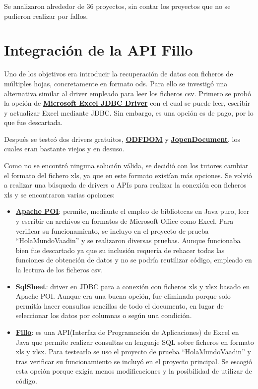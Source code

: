 Se analizaron alrededor de 36 proyectos, sin contar los proyectos que no se pudieron realizar por fallos.

\section{Integración de la API Fillo}
Uno de los objetivos era introducir la recuperación de datos con ficheros de múltiples hojas, concretamente en formato ods.
Para ello se investigó una alternativa similar al driver empleado para leer los ficheros csv. Primero se probó la opción de \textbf{\href{https://www.cdata.com/drivers/excel/jdbc/}{Microsoft Excel JDBC Driver}} con el cual se puede leer, escribir y actualizar Excel mediante JDBC. Sin embargo, es una opción es de pago, por lo que fue descartada. 

Después se testeó dos drivers gratuitos, \textbf{\href{https://odftoolkit.org/}{ODFDOM}} y \textbf{\href{http://www.jopendocument.org/}{JopenDocument}}, los cuales eran bastante viejos y en desuso.

Como no se encontró ninguna solución válida, se decidió con los tutores cambiar el formato del fichero xls, ya que en este formato existían más opciones. Se volvió a realizar una búsqueda de drivers o APIs para realizar la conexión con ficheros xls y se encontraron varias opciones: 
\begin{itemize}
	\item \textbf{\href{https://poi.apache.org/}{Apache POI}}: permite, mediante el empleo de bibliotecas en Java puro, leer y escribir en archivos en formatos de Microsoft Office como Excel. Para verificar su funcionamiento, se incluyo en el proyecto de prueba ``HolaMundoVaadin'' y se realizaron diversas pruebas. Aunque funcionaba bien fue descartado ya que su inclusión requería de rehacer todas las funciones de obtención de datos y no se podría reutilizar código, empleado en la lectura de los ficheros csv.
	\item \textbf{\href{https://code.google.com/archive/p/sqlsheet/}{SqlSheet}}: driver en JDBC para a conexión con ficheros xls y xlsx basado en Apache POI. Aunque era una buena opción, fue eliminada porque solo permitía hacer consultas sencillas de todo el documento, en lugar de seleccionar los datos por columnas o según una condición. 
	\item \textbf{\href{https://codoid.com/fillo/}{Fillo}}: es una API(Interfaz de Programación de Aplicaciones) de Excel en Java que permite realizar consultas en lenguaje SQL sobre ficheros en formato xls y xlsx. Para testearlo se uso el proyecto de prueba ``HolaMundoVaadin'' y tras verificar su funcionamiento se incluyó en el proyecto principal. Se escogió esta opción porque exigía menos modificaciones y la posibilidad de utilizar de código.
\end{itemize}

